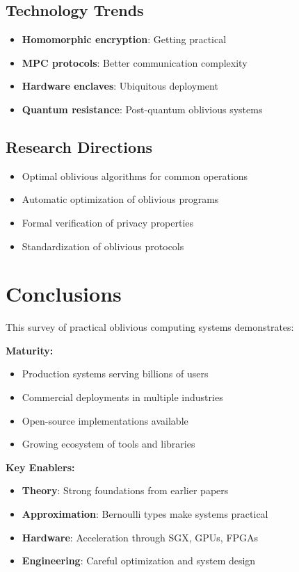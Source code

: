 \documentclass[11pt,final]{article}
\begin{document}
\subsection{Technology Trends}

\begin{itemize}
    \item \textbf{Homomorphic encryption}: Getting practical
    \item \textbf{MPC protocols}: Better communication complexity
    \item \textbf{Hardware enclaves}: Ubiquitous deployment
    \item \textbf{Quantum resistance}: Post-quantum oblivious systems
\end{itemize}

\subsection{Research Directions}

\begin{itemize}
    \item Optimal oblivious algorithms for common operations
    \item Automatic optimization of oblivious programs
    \item Formal verification of privacy properties
    \item Standardization of oblivious protocols
\end{itemize}

\section{Conclusions}

This survey of practical oblivious computing systems demonstrates:

\textbf{Maturity:}
\begin{itemize}
    \item Production systems serving billions of users
    \item Commercial deployments in multiple industries
    \item Open-source implementations available
    \item Growing ecosystem of tools and libraries
\end{itemize}

\textbf{Key Enablers:}
\begin{itemize}
    \item \textbf{Theory}: Strong foundations from earlier papers
    \item \textbf{Approximation}: Bernoulli types make systems practical
    \item \textbf{Hardware}: Acceleration through SGX, GPUs, FPGAs
    \item \textbf{Engineering}: Careful optimization and system design
\end{itemize}
\end{document}
